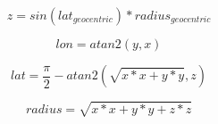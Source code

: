 \documentclass[12pt]{article}
\begin{document}
{\newpage
\clearpage
\samepage \begin{displaymath}z = sin(lat_\mathit{geocentric}) * radius_\mathit{geocentric} \end{displaymath}
}

{\newpage
\clearpage
\samepage \begin{displaymath}lon = atan2( y, x ) \end{displaymath}
}

{\newpage
\clearpage
\samepage \begin{displaymath}lat = \frac{\pi}{2} - atan2( \sqrt{x*x + y*y}, z ) \end{displaymath}
}

{\newpage
\clearpage
\samepage \begin{displaymath}radius = \sqrt{x*x + y*y + z*z} \end{displaymath}
}

\end{document}
